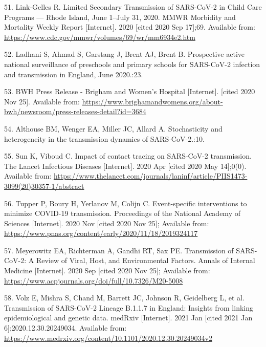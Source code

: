 \documentclass[
]{article}
\begin{document}
\leavevmode\hypertarget{ref-link-gelles_limited_2020}{}%
51. Link-Gelles R. Limited Secondary Transmission of SARS-CoV-2 in Child
Care Programs --- Rhode Island, June 1--July 31, 2020. MMWR Morbidity
and Mortality Weekly Report {[}Internet{]}. 2020 {[}cited 2020 Sep
17{]};69. Available from:
\url{https://www.cdc.gov/mmwr/volumes/69/wr/mm6934e2.htm}

\leavevmode\hypertarget{ref-ladhani_prospective_nodate}{}%
52. Ladhani S, Ahmad S, Garstang J, Brent AJ, Brent B. Prospective
active national surveillance of preschools and primary schools for
SARS-CoV-2 infection and transmission in England, June 2020.:23.

\leavevmode\hypertarget{ref-noauthor_bwh_nodate}{}%
53. BWH Press Release - Brigham and Women's Hospital {[}Internet{]}.
{[}cited 2020 Nov 25{]}. Available from:
\url{https://www.brighamandwomens.org/about-bwh/newsroom/press-releases-detail?id=3684}

\leavevmode\hypertarget{ref-althouse_stochasticity_nodate}{}%
54. Althouse BM, Wenger EA, Miller JC, Allard A. Stochasticity and
heterogeneity in the transmission dynamics of SARS-CoV-2.:10.

\leavevmode\hypertarget{ref-sun_impact_2020}{}%
55. Sun K, Viboud C. Impact of contact tracing on SARS-CoV-2
transmission. The Lancet Infectious Diseases {[}Internet{]}. 2020 Apr
{[}cited 2020 May 14{]};0(0). Available from:
\url{https://www.thelancet.com/journals/laninf/article/PIIS1473-3099(20)30357-1/abstract}

\leavevmode\hypertarget{ref-tupper_event-specific_2020}{}%
56. Tupper P, Boury H, Yerlanov M, Colijn C. Event-specific
interventions to minimize COVID-19 transmission. Proceedings of the
National Academy of Sciences {[}Internet{]}. 2020 Nov {[}cited 2020 Nov
25{]}; Available from:
\url{https://www.pnas.org/content/early/2020/11/18/2019324117}

\leavevmode\hypertarget{ref-meyerowitz_transmission_2020}{}%
57. Meyerowitz EA, Richterman A, Gandhi RT, Sax PE. Transmission of
SARS-CoV-2: A Review of Viral, Host, and Environmental Factors. Annals
of Internal Medicine {[}Internet{]}. 2020 Sep {[}cited 2020 Nov 25{]};
Available from:
\url{https://www.acpjournals.org/doi/full/10.7326/M20-5008}

\leavevmode\hypertarget{ref-volz_transmission_2021}{}%
58. Volz E, Mishra S, Chand M, Barrett JC, Johnson R, Geidelberg L, et
al. Transmission of SARS-CoV-2 Lineage B.1.1.7 in England: Insights from
linking epidemiological and genetic data. medRxiv {[}Internet{]}. 2021
Jan {[}cited 2021 Jan 6{]};2020.12.30.20249034. Available from:
\url{https://www.medrxiv.org/content/10.1101/2020.12.30.20249034v2}
\end{document}
